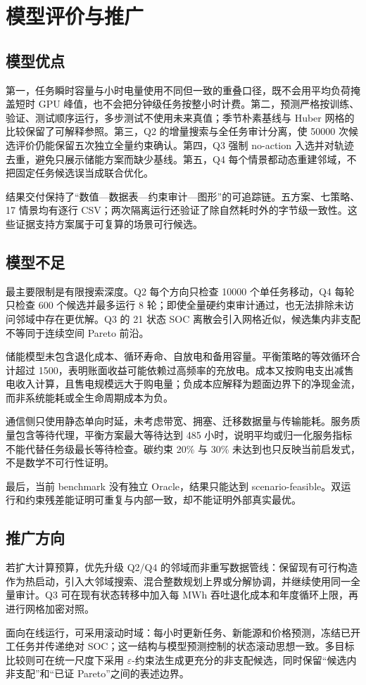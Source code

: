 \section{模型评价与推广}
\subsection{模型优点}
第一，任务瞬时容量与小时电量使用不同但一致的重叠口径，既不会用平均负荷掩盖短时 GPU 峰值，也不会把分钟级任务按整小时计费。第二，预测严格按训练、验证、测试顺序运行，多步测试不使用未来真值；季节朴素基线与 Huber 网格的比较保留了可解释参照。第三，Q2 的增量搜索与全任务审计分离，使 50000 次候选评价仍能保留五次独立全量约束确认。第四，Q3 强制 no-action 入选并对轨迹去重，避免只展示储能方案而缺少基线。第五，Q4 每个情景都动态重建邻域，不把固定任务候选误当成联合优化。

结果交付保持了“数值—数据表—约束审计—图形”的可追踪链。五方案、七策略、17 情景均有逐行 CSV；两次隔离运行还验证了除自然耗时外的字节级一致性。这些证据支持方案属于可复算的场景可行候选。

\subsection{模型不足}
最主要限制是有限搜索深度。Q2 每个方向只检查 10000 个单任务移动，Q4 每轮只检查 600 个候选并最多运行 8 轮；即使全量硬约束审计通过，也无法排除未访问邻域中存在更优解。Q3 的 21 状态 SOC 离散会引入网格近似，候选集内非支配不等同于连续空间 Pareto 前沿。

储能模型未包含退化成本、循环寿命、自放电和备用容量。平衡策略的等效循环合计超过 1500，表明账面收益可能依赖过高频率的充放电。成本又按购电支出减售电收入计算，且售电规模远大于购电量；负成本应解释为题面边界下的净现金流，而非系统能耗或全生命周期成本为负。

通信侧只使用静态单向时延，未考虑带宽、拥塞、迁移数据量与传输能耗。服务质量包含等待代理，平衡方案最大等待达到 485 小时，说明平均或归一化服务指标不能代替任务级最长等待检查。碳约束 20\% 与 30\% 未达到也只反映当前启发式，不是数学不可行性证明。

最后，当前 benchmark 没有独立 Oracle，结果只能达到 scenario-feasible。双运行和约束残差能证明可重复与内部一致，却不能证明外部真实最优。

\subsection{推广方向}
若扩大计算预算，优先升级 Q2/Q4 的邻域而非重写数据管线：保留现有可行构造作为热启动，引入大邻域搜索、混合整数规划上界或分解协调，并继续使用同一全量审计。Q3 可在现有状态转移中加入每 MWh 吞吐退化成本和年度循环上限，再进行网格加密对照。

面向在线运行，可采用滚动时域：每小时更新任务、新能源和价格预测，冻结已开工任务并传递绝对 SOC；这一结构与模型预测控制的状态滚动思想一致\cite{rawlings2017model}。多目标比较则可在统一尺度下采用 $\varepsilon$-约束法生成更充分的非支配候选\cite{miettinen1999nonlinear}，同时保留“候选内非支配”和“已证 Pareto”之间的表述边界。
